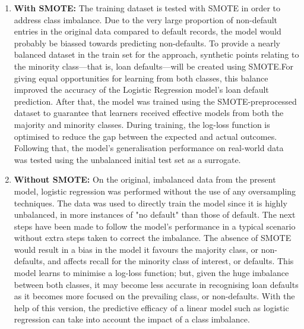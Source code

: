 \documentclass[12pt, a4paper,oneside]{book}
\numberwithin{equation}{section}
\begin{document}
\begin{enumerate}
    \item\textbf{With SMOTE:} \newline
    The training dataset is tested with SMOTE in order to address class imbalance. Due to the very large proportion of non-default entries in the original data compared to default records, the model would probably be biassed towards predicting non-defaults. To provide a nearly balanced dataset in the train set for the approach, synthetic points relating to the minority class—that is, loan defaults—will be created using SMOTE.For giving equal opportunities for learning from both classes, this balance improved the accuracy of the Logistic Regression model's loan default prediction. After that, the model was trained using the SMOTE-preprocessed dataset to guarantee that learners received effective models from both the majority and minority classes. During training, the log-loss function is optimised to reduce the gap between the expected and actual outcomes. Following that, the model's generalisation performance on real-world data was tested using the unbalanced initial test set as a surrogate.
    
    \item\textbf{Without SMOTE:} \newline
    On the original, imbalanced data from the present model, logistic regression was performed without the use of any oversampling techniques. The data was used to directly train the model since it is highly unbalanced, in more instances of "no default" than those of default. The next steps have been made to follow the model's performance in a typical scenario without extra steps taken to correct the imbalance.
    The absence of SMOTE would result in a bias in the model it favours the majority class, or non-defaults, and affects recall for the minority class of interest, or defaults. This model learns to minimise a log-loss function; but, given the huge imbalance between both classes, it may become less accurate in recognising loan defaults as it becomes more focused on the prevailing class, or non-defaults. With the help of this version, the predictive efficacy of a linear model such as logistic regression can take into account the impact of a class imbalance.
\end{enumerate}
\end{document}
